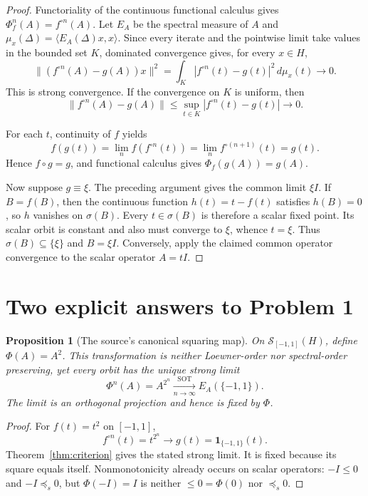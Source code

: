 \documentclass[11pt]{article}
\newtheorem{proposition}{Proposition}
\newcommand{\sot}{\mathrm{SOT}}
\newcommand{\1}{\mathbf 1}
\begin{document}
\begin{proof}
Functoriality of the continuous functional calculus gives
\(\Phi_f^n(A)=f^{\circ n}(A)\).  Let \(E_A\) be the spectral measure of \(A\)
and \(\mu_x(\Delta)=\langle E_A(\Delta)x,x\rangle\).  Since every iterate and
the pointwise limit take values in the bounded set \(K\), dominated
convergence gives, for every \(x\in H\),
\[
 \bigl\|(f^{\circ n}(A)-g(A))x\bigr\|^2
 =\int_K |f^{\circ n}(t)-g(t)|^2\,d\mu_x(t)
 \longrightarrow0.
\]
This is strong convergence.  If the convergence on \(K\) is uniform, then
\[
 \|f^{\circ n}(A)-g(A)\|
 \le \sup_{t\in K}|f^{\circ n}(t)-g(t)|\longrightarrow0.
\]

For each \(t\), continuity of \(f\) yields
\[
 f(g(t))=\lim_n f(f^{\circ n}(t))
 =\lim_n f^{\circ(n+1)}(t)=g(t).
\]
Hence \(f\circ g=g\), and functional calculus gives
\(\Phi_f(g(A))=g(A)\).

Now suppose \(g\equiv\xi\).  The preceding argument gives the common limit
\(\xi I\).  If \(B=f(B)\), then the continuous function \(h(t)=t-f(t)\)
satisfies \(h(B)=0\), so \(h\) vanishes on \(\sigma(B)\).  Every
\(t\in\sigma(B)\) is therefore a scalar fixed point.  Its scalar orbit is
constant and also must converge to \(\xi\), whence \(t=\xi\).  Thus
\(\sigma(B)\subseteq\{\xi\}\) and \(B=\xi I\).  Conversely, apply the claimed
common operator convergence to the scalar operator \(A=tI\).
\end{proof}

\section{Two explicit answers to Problem 1}

\begin{proposition}[The source's canonical squaring map]\label{prop:square}
On \(\mathcal S_{[-1,1]}(H)\), define \(\Phi(A)=A^2\).  This transformation
is neither Loewner-order nor spectral-order preserving, yet every orbit has
the unique strong limit
\[
 \Phi^n(A)=A^{2^n}\xrightarrow[n\to\infty]{\sot}
 E_A(\{-1,1\}).
\]
The limit is an orthogonal projection and hence is fixed by \(\Phi\).
\end{proposition}

\begin{proof}
For \(f(t)=t^2\) on \([-1,1]\),
\[
 f^{\circ n}(t)=t^{2^n}\longrightarrow
 g(t)=\1_{\{-1,1\}}(t).
\]
Theorem~\ref{thm:criterion} gives the stated strong limit.  It is fixed
because its square equals itself.  Nonmonotonicity already occurs on scalar
operators: \(-I\le0\) and \(-I\preccurlyeq_s0\), but
\(\Phi(-I)=I\) is neither \(\le0=\Phi(0)\) nor
\(\preccurlyeq_s0\).
\end{proof}
\end{document}
